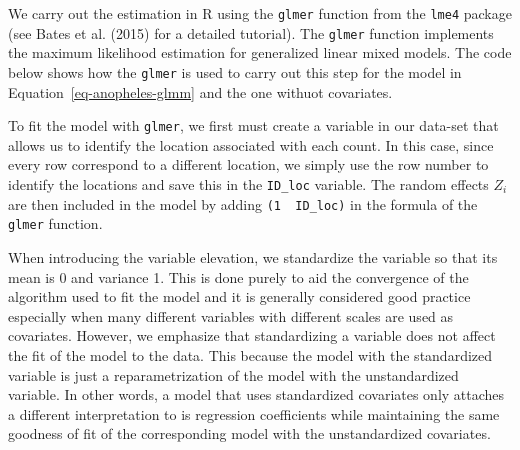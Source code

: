 \documentclass[
  letterpaper,
]{krantz}
\newenvironment{Shaded}{\begin{snugshade}}{\end{snugshade}}
\newcommand{\AttributeTok}[1]{\textcolor[rgb]{0.40,0.45,0.13}{#1}}
\newcommand{\CommentTok}[1]{\textcolor[rgb]{0.37,0.37,0.37}{#1}}
\newcommand{\DecValTok}[1]{\textcolor[rgb]{0.68,0.00,0.00}{#1}}
\newcommand{\FunctionTok}[1]{\textcolor[rgb]{0.28,0.35,0.67}{#1}}
\newcommand{\NormalTok}[1]{\textcolor[rgb]{0.00,0.23,0.31}{#1}}
\newcommand{\OtherTok}[1]{\textcolor[rgb]{0.00,0.23,0.31}{#1}}
\newcommand{\SpecialCharTok}[1]{\textcolor[rgb]{0.37,0.37,0.37}{#1}}
\begin{document}
We carry out the estimation in R using the \texttt{glmer} function from
the \texttt{lme4} package (see Bates et al. (2015) for a detailed
tutorial). The \texttt{glmer} function implements the maximum likelihood
estimation for generalized linear mixed models. The code below shows how
the \texttt{glmer} is used to carry out this step for the model in
Equation~\ref{eq-anopheles-glmm} and the one withuot covariates.

\begin{Shaded}
\end{Shaded}

To fit the model with \texttt{glmer}, we first must create a variable in
our data-set that allows us to identify the location associated with
each count. In this case, since every row correspond to a different
location, we simply use the row number to identify the locations and
save this in the \texttt{ID\_loc} variable. The random effects \(Z_i\)
are then included in the model by adding
\texttt{(1\ \textbar{}\ ID\_loc)} in the formula of the \texttt{glmer}
function.

When introducing the variable elevation, we standardize the variable so
that its mean is 0 and variance 1. This is done purely to aid the
convergence of the algorithm used to fit the model and it is generally
considered good practice especially when many different variables with
different scales are used as covariates. However, we emphasize that
standardizing a variable does not affect the fit of the model to the
data. This because the model with the standardized variable is just a
reparametrization of the model with the unstandardized variable. In
other words, a model that uses standardized covariates only attaches a
different interpretation to is regression coefficients while maintaining
the same goodness of fit of the corresponding model with the
unstandardized covariates.
\end{document}
